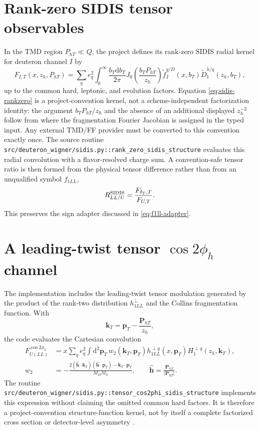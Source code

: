 \documentclass[11pt,oneside]{book}
\newcommand{\dd}{\mathrm{d}}
\newcommand{\codepath}[1]{\nolinkurl{#1}}
\begin{document}
\section{Rank-zero SIDIS tensor observables}

In the TMD region $P_{hT}\ll Q$, the project defines its rank-zero SIDIS radial kernel for deuteron channel $I$ by
\begin{equation}
 F_{I,T}(x,z_h,P_{hT})
 =\sum_q e_q^2
 \int_0^\infty\frac{b_T\dd b_T}{2\pi}
 J_0\!\left(\frac{b_TP_{hT}}{z_h}\right)
 \widetilde f^{q/D}_{I}(x,b_T)
 \widetilde D_1^{h/q}(z_h,b_T),
 \label{eq:sidis-rankzero}
\end{equation}
up to the common hard, leptonic, and evolution factors.  Equation \cref{eq:sidis-rankzero} is a project-convention kernel, not a scheme-independent factorization identity: the argument $b_TP_{hT}/z_h$ and the absence of an additional displayed $z_h^{-2}$ follow from where the fragmentation Fourier Jacobian is assigned in the typed input.  Any external TMD/FF provider must be converted to this convention exactly once.  The source routine \codepath{src/deuteron_wigner/sidis.py::rank_zero_sidis_structure} evaluates this radial convolution with a flavor-resolved charge sum.  A convention-safe tensor ratio is then formed from the physical tensor difference rather than from an unqualified symbol $f_{1LL}$,
\begin{equation}
 R_{LL/U}^{\rm SIDIS}
 =\frac{F_{\delta_T,T}}{F_{U,T}}.
 \label{eq:sidis-tensor-ratio}
\end{equation}
This preserves the sign adapter discussed in \cref{eq:f1ll-adapter}.

\section{A leading-twist tensor \texorpdfstring{$\cos 2\phi_h$}{cos 2 phi-h} channel}

The implementation includes the leading-twist tensor modulation generated by the product of the rank-two distribution $h_{1LL}^{\perp}$ and the Collins fragmentation function.  With
\begin{equation}
 \bm k_T=\bm p_T-\frac{\bm P_{hT}}{z_h},
\end{equation}
the code evaluates the Cartesian convolution
\begin{align}
 F_{U(LL)}^{\cos2\phi_h}
 &=x\sum_q e_q^2\int\dd^2\bm p_T\,
 w_2(\bm k_T,\bm p_T)
 h_{1LL}^{\perp q}(x,\bm p_T)
 H_1^{\perp q}(z_h,\bm k_T),
 \label{eq:sidis-cos2phi}\\
 w_2
 &=-\frac{2(\hat{\bm h}\!\cdot\!\bm k_T)
              (\hat{\bm h}\!\cdot\!\bm p_T)
              -\bm k_T\!\cdot\!\bm p_T}
             {M_D M_h},
 \qquad
 \hat{\bm h}=\frac{\bm P_{hT}}{|\bm P_{hT}|}.
 \label{eq:sidis-cos2phi-weight}
\end{align}
The routine \codepath{src/deuteron_wigner/sidis.py::tensor_cos2phi_sidis_structure} implements this expression without claiming the omitted common hard factors.  It is therefore a project-convention structure-function kernel, not by itself a complete factorized cross section or detector-level asymmetry \cite{BacchettaMulders2000,BacchettaEtAl2007SIDIS}.
\end{document}

